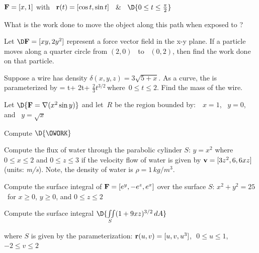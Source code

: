 \documentclass[12pt]{amsart}
\numberwithin{equation}{section}
\begin{document}
$\text{\bf F} = [x,1]$  with \, $\text{\bf r}(t) = [\cos t, \sin t]$ \, \& \, $\D{0 \le t \le \frac{\pi}{2}}$
	
\vspace{0.2cm}
	
What is the work done to move the object along this path when exposed to ?
	
\vspace{0.2cm}

\EX Let $\D\text{\bf F} = [xy,2y^2]$ represent a force vector field in the x-y plane.  If a particle moves along a quarter circle from $(2,0)$ \, to \, $(0,2)$, then find the work done on that particle.

\vspace{0.2cm}

\EX Suppose a wire has density $\delta(x,y,z) = 3\sqrt{5+x}$.  As a curve, the is parameterized by \RT = t\VI + 2t\VJ + $\frac{2}{3}t^{3/2}$\VK \,where\, $0 \le t \le 2$. Find the mass of the wire.

\vspace{0.2cm}

\EX Let $\D{{\bf F} = \nabla(x^2\sin y)}$ and let\, $R$ be the region bounded by: \,\, $x=1$, \, $y=0$, \, and \, $y=\sqrt{x}$

\vspace{0.2cm}

Compute \quad $\D{\OWORK}$

\vspace{0.2cm}

\EX Compute the flux of water through the parabolic cylinder $S:\, y=x^2$ where $0 \le x \le 2$ and $0 \le z \le 3$ if the velocity flow of water is given by ${\bf v} = [3z^2, 6, 6xz]$ (units: {\em m/s}).  Note, the density of water is $\rho = 1 \, kg/m^3$.

\vspace{0.2cm}

\EX Compute the surface integral of ${\bf F} = [e^y, -e^z, e^x]$ over the surface $S:\, x^2 + y^2 = 25$ \, for $x \ge 0$, $y \ge 0$, and $0 \le z \le 2$

\vspace{0.2cm}

\EX Compute the surface integral \qquad $\D{\iint \limits_{S} (1 + 9xz)^{3/2}\, dA}$

\vspace{0.1cm}

where $S$ is given by the parameterization: ${\bf r}(u,v) = [u,v,u^3]$,\,\, $0 \le u \le 1$,\,\, $-2 \le v \le 2$
\end{document}
